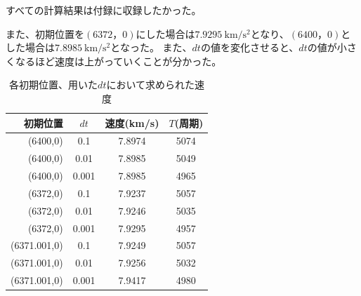 \documentclass[11pt,b5paper,papersize,dvipdfmx]{jsbook}
\begin{document}
すべての計算結果は付録に収録したかった。\par
また、初期位置を$(6372，0)$にした場合は$7.9295\ \mathrm{km/s^2}$となり、$(6400，0)$とした場合は$7.8985\ \mathrm{km/s^2}$となった。
また、$dt$の値を変化させると、$dt$の値が小さくなるほど速度は上がっていくことが分かった。
\begin{table}[H]
    \centering
    \caption{各初期位置、用いた$dt$において求められた速度}
        \begin{tabular}{r|ccc}
            \hline
            初期位置	     &$dt$	&速度(km/s)	&$T$(周期)\\\hline
            (6400,0)	    &0.1	&7.8974	&5074\\
            (6400,0)	    &0.01	&7.8985	&5049\\
            (6400,0)	    &0.001	&7.8985	&4965\\
            (6372,0)	    &0.1	&7.9237	&5057\\
            (6372,0)	    &0.01	&7.9246	&5035\\
            (6372,0)	    &0.001	&7.9295	&4957\\
            (6371.001,0)	&0.1	&7.9249	&5057\\
            (6371.001,0)	&0.01	&7.9256	&5032\\
            (6371.001,0)	&0.001	&7.9417	&4980\\\hline
       \end{tabular}
        \label{tbl:sj-datadt}
\end{table}


\end{document}
